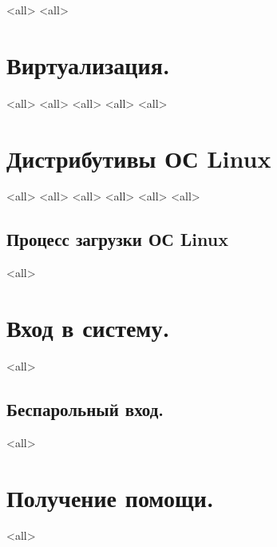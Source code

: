 \mode<all>{}
\mode<all>{}
\section{Виртуализация.}
\mode<all>{}
\mode<all>{}
\mode<all>{}
\mode<all>{}
\mode<all>{}

\section{Дистрибутивы ОС Linux}
\mode<all>{}
\mode<all>{}
\mode<all>{}
\mode<all>{}
\mode<all>{}
\mode<all>{}


\subsection{Процесс загрузки ОС Linux}
\mode<all>{}


\section{Вход в систему.}
\mode<all>{}
\subsection{Беспарольный вход.}
\mode<all>{}


\section{Получение помощи.}
\mode<all>{}


